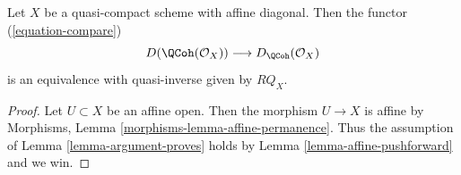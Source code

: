 \begin{proposition}
\label{proposition-quasi-compact-affine-diagonal}
Let $X$ be a quasi-compact scheme with affine diagonal.
Then the functor (\ref{equation-compare})
$$
D(\QCoh(\mathcal{O}_X))
\longrightarrow
D_\QCoh(\mathcal{O}_X)
$$
is an equivalence with quasi-inverse given by $RQ_X$.
\end{proposition}

\begin{proof}
Let $U \subset X$ be an affine open. Then the morphism
$U \to X$ is affine by
Morphisms, Lemma \ref{morphisms-lemma-affine-permanence}.
Thus the assumption of Lemma \ref{lemma-argument-proves}
holds by Lemma \ref{lemma-affine-pushforward} and we win.
\end{proof}
